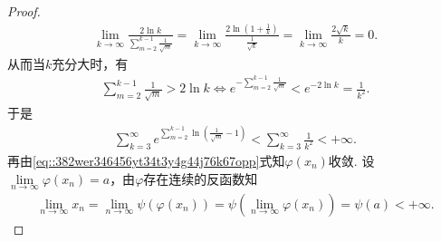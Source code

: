 \documentclass[../../main.tex]{subfiles}%
\begin{document}
\begin{proof}
\begin{align*}
\lim_{k \to \infty} \frac{2\ln k}{\sum\limits_{m=2}^{k-1} \frac{1}{\sqrt{m}}} = \lim_{k \to \infty} \frac{2\ln\left( 1 + \frac{1}{k} \right)}{\frac{1}{\sqrt{k}}} = \lim_{k \to \infty} \frac{2\sqrt{k}}{k} = 0.
\end{align*}
从而当$k$充分大时，有
\begin{align*}
\sum\limits_{m=2}^{k-1} \frac{1}{\sqrt{m}} > 2\ln k \Longleftrightarrow e^{-\sum\limits_{m=2}^{k-1} \frac{1}{\sqrt{m}}} < e^{-2\ln k} = \frac{1}{k^2}.
\end{align*}
于是
\begin{align*}
\sum\limits_{k=3}^{\infty} e^{\sum\limits_{m=2}^{k-1} \ln\left( \frac{1}{\sqrt{m}} - 1 \right)} < \sum\limits_{k=3}^{\infty} \frac{1}{k^2} < +\infty.
\end{align*}
再由\eqref{eq::382wer346456yt34t3y4g44j76k67opp}式知$\varphi(x_n)$收敛. 设$\lim\limits_{n \to \infty} \varphi(x_n) = a$，由$\varphi$存在连续的反函数知
\begin{align*}
\lim_{n\rightarrow \infty} x_n=\lim_{n\rightarrow \infty} \psi \left( \varphi \left( x_n \right) \right) =\psi \left( \lim_{n\rightarrow \infty} \varphi \left( x_n \right) \right) =\psi (a)<+\infty .
\end{align*}
\end{proof}
\end{document}
